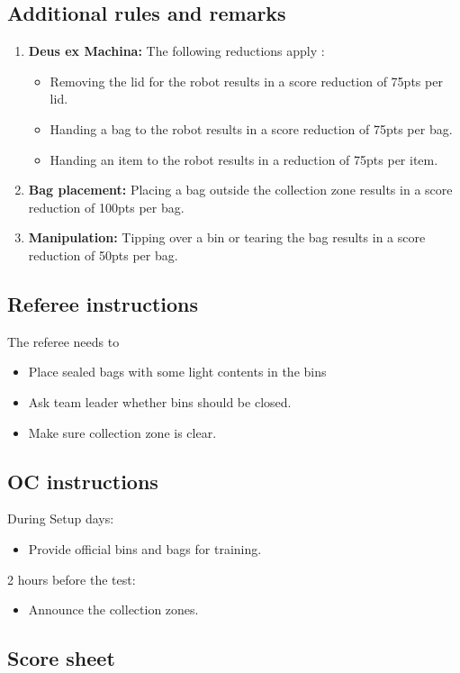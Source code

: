 \subsection*{Additional rules and remarks}
\begin{enumerate}[nosep]
	\item \textbf{Deus ex Machina:} The following reductions apply :
	\begin{itemize}
	    \item Removing the lid for the robot results in a score reduction of 75pts per lid.
		\item Handing a bag to the robot results in a score reduction of 75pts per bag.
		\item Handing an item to the robot results in a reduction of 75pts per item.
	\end{itemize}
	\item \textbf{Bag placement:} Placing a bag outside the collection zone results in a score reduction of 100pts per bag.
	\item \textbf{Manipulation:}  Tipping over a bin or tearing the bag results in a score reduction of 50pts per bag.

\end{enumerate}

\subsection*{Referee instructions}

The referee needs to
\begin{itemize}
	\item Place sealed bags with some light contents in the bins
	\item Ask team leader whether bins should be closed.
	\item Make sure collection zone is clear.
\end{itemize}

\subsection*{OC instructions}
During Setup days:
\begin{itemize}
	\item Provide official bins and bags for training.
\end{itemize}

2 hours before the test:
\begin{itemize}
	\item Announce the collection zones.
\end{itemize}

\subsection*{Score sheet}



